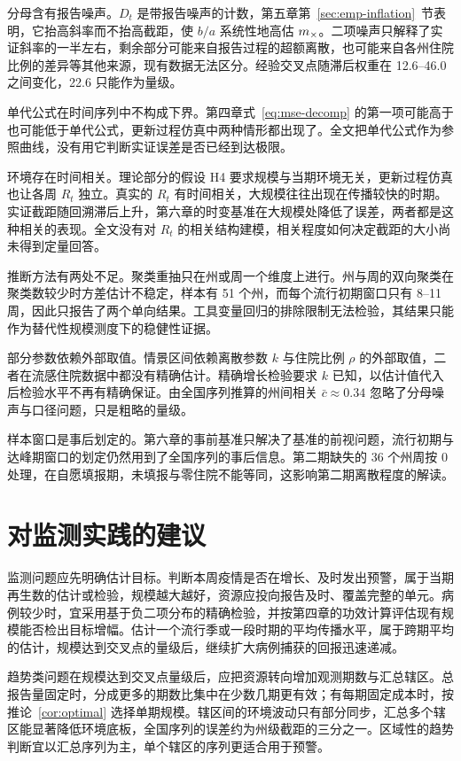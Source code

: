 分母含有报告噪声。$D_t$ 是带报告噪声的计数，第五章第~\ref{sec:emp-inflation}~节表明，它抬高斜率而不抬高截距，使 $b/a$ 系统性地高估 $m_{\times}$。二项噪声只解释了实证斜率的一半左右，剩余部分可能来自报告过程的超额离散，也可能来自各州住院比例的差异等其他来源，现有数据无法区分。经验交叉点随滞后权重在 12.6--46.0 之间变化，22.6 只能作为量级。

单代公式在时间序列中不构成下界。第四章式~\eqref{eq:mse-decomp} 的第一项可能高于也可能低于单代公式，更新过程仿真中两种情形都出现了。全文把单代公式作为参照曲线，没有用它判断实证误差是否已经到达极限。

环境存在时间相关。理论部分的假设 H4 要求规模与当期环境无关，更新过程仿真也让各周 $R_t$ 独立。真实的 $R_t$ 有时间相关，大规模往往出现在传播较快的时期。实证截距随回溯滞后上升，第六章的时变基准在大规模处降低了误差，两者都是这种相关的表现。全文没有对 $R_t$ 的相关结构建模，相关程度如何决定截距的大小尚未得到定量回答。

推断方法有两处不足。聚类重抽只在州或周一个维度上进行。州与周的双向聚类在聚类数较少时方差估计不稳定\citep{cameron2011robust, cameron2015practitioner}，样本有 51 个州，而每个流行初期窗口只有 8--11 周，因此只报告了两个单向结果。工具变量回归的排除限制无法检验，其结果只能作为替代性规模测度下的稳健性证据。

部分参数依赖外部取值。情景区间依赖离散参数 $k$ 与住院比例 $\rho$ 的外部取值，二者在流感住院数据中都没有精确估计。精确增长检验要求 $k$ 已知，以估计值代入后检验水平不再有精确保证。由全国序列推算的州间相关 $\bar c\approx0.34$ 忽略了分母噪声与口径问题，只是粗略的量级。

样本窗口是事后划定的。第六章的事前基准只解决了基准的前视问题，流行初期与达峰期窗口的划定仍然用到了全国序列的事后信息。第二期缺失的 36 个州周按 0 处理，在自愿填报期，未填报与零住院不能等同，这影响第二期离散程度的解读。

\section{对监测实践的建议}
\label{sec:concl-practice}

监测问题应先明确估计目标。判断本周疫情是否在增长、及时发出预警，属于当期再生数的估计或检验，规模越大越好，资源应投向报告及时、覆盖完整的单元。病例较少时，宜采用基于负二项分布的精确检验，并按第四章的功效计算评估现有规模能否检出目标增幅。估计一个流行季或一段时期的平均传播水平，属于跨期平均的估计，规模达到交叉点的量级后，继续扩大病例捕获的回报迅速递减。

趋势类问题在规模达到交叉点量级后，应把资源转向增加观测期数与汇总辖区。总报告量固定时，分成更多的期数比集中在少数几期更有效；有每期固定成本时，按推论~\ref{cor:optimal} 选择单期规模。辖区间的环境波动只有部分同步，汇总多个辖区能显著降低环境底板，全国序列的误差约为州级截距的三分之一。区域性的趋势判断宜以汇总序列为主，单个辖区的序列更适合用于预警。


